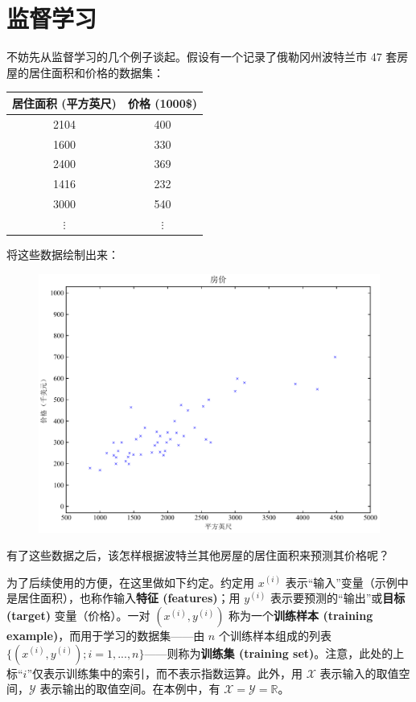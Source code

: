 \part{监督学习}

不妨先从监督学习的几个例子谈起。假设有一个记录了俄勒冈州波特兰市 47 套房屋的居住面积和价格的数据集：

\begin{table}[h]
    \centering
    \begin{tabular}{c|c}
        居住面积 (平方英尺) & 价格 (1000\$) \\
        \hline
        2104 & 400 \\
        1600 & 330 \\
        2400 & 369 \\
        1416 & 232 \\
        3000 & 540 \\
        $\vdots$ & $\vdots$
    \end{tabular}
    \label{tab:house_example}
\end{table}

将这些数据绘制出来：

\begin{figure}[H]
    \centering
    \includegraphics[width=0.5\linewidth]{figs/house_dataset_plot1.pdf}
\end{figure}

有了这些数据之后，该怎样根据波特兰其他房屋的居住面积来预测其价格呢？

为了后续使用的方便，在这里做如下约定。约定用 $x^{(i)}$ 表示“输入”变量（示例中是居住面积），也称作输入\textbf{特征 (features)}；用 $y^{(i)}$ 表示要预测的“输出”或\textbf{目标 (target) }变量（价格）。一对 $(x^{(i)}, y^{(i)})$ 称为一个\textbf{训练样本 (training example)}，而用于学习的数据集——由 $n$ 个训练样本组成的列表 $\{(x^{(i)}, y^{(i)}); i = 1,...,n\}$——则称为\textbf{训练集 (training set)}。注意，此处的上标“$i$”仅表示训练集中的索引，而不表示指数运算。此外，用 $\mathcal{X}$ 表示输入的取值空间，$\mathcal{Y}$ 表示输出的取值空间。在本例中，有 $\mathcal{X} = \mathcal{Y} = \mathbb{R}$。

